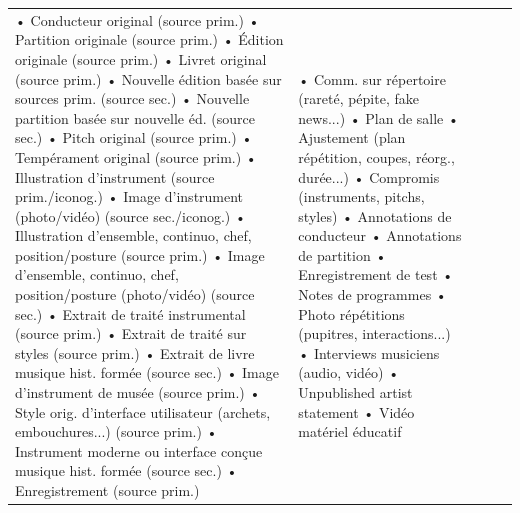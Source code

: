 \begin{landscape}
\begin{table}[htbp]
{\begin{tabular}{|p{3.4cm}|p{6.8cm}|p{3.8cm}|p{3.2cm}|p{3.2cm}|}
				• Conducteur original (source prim.) \newline
				• Partition originale (source prim.) \newline
				• Édition originale (source prim.) \newline
				• Livret original (source prim.) \newline
				• Nouvelle édition basée sur sources prim. (source sec.) \newline
				• Nouvelle partition basée sur nouvelle éd. (source sec.) \newline
				• Pitch original (source prim.) \newline
				• Tempérament original (source prim.) \newline
				• Illustration d’instrument (source prim./iconog.) \newline
				• Image d’instrument (photo/vidéo) (source sec./iconog.) \newline
				• Illustration d’ensemble, continuo, chef, position/posture (source prim.) \newline
				• Image d’ensemble, continuo, chef, position/posture (photo/vidéo) (source sec.) \newline
				• Extrait de traité instrumental (source prim.) \newline
				• Extrait de traité sur styles (source prim.) \newline
				• Extrait de livre musique hist. formée (source sec.) \newline
				• Image d’instrument de musée (source prim.) \newline
				• Style orig. d’interface utilisateur (archets, embouchures...) (source prim.) \newline
				• Instrument moderne ou interface conçue musique hist. formée (source sec.) \newline
				• Enregistrement (source prim.) & 
				
				• Comm. sur répertoire (rareté, pépite, fake news...) \newline
				• Plan de salle \newline
				• Ajustement (plan répétition, coupes, réorg., durée...) \newline
				• Compromis (instruments, pitchs, styles) \newline
				• Annotations de conducteur \newline
				• Annotations de partition \newline
				• Enregistrement de test \newline
				• Notes de programmes \newline
				• Photo répétitions (pupitres, interactions...) \newline
				• Interviews musiciens (audio, vidéo) \newline
				• Unpublished artist statement \newline
				• Vidéo matériel éducatif & 
				

\end{tabular}}
\end{table}
\end{landscape}
